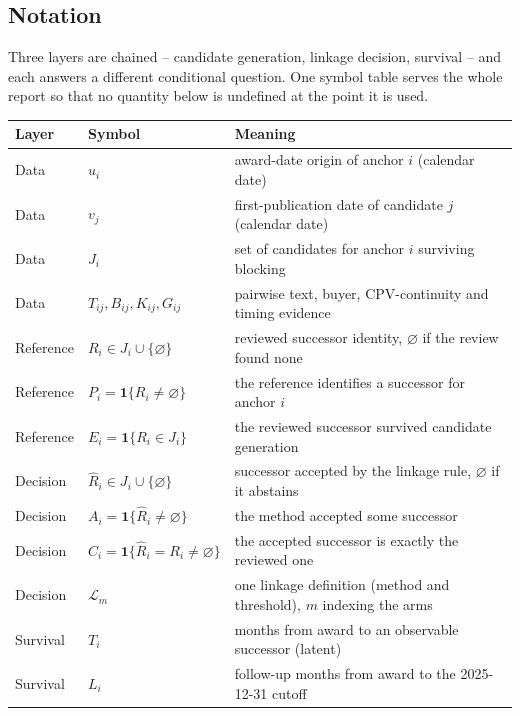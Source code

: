 \documentclass[11pt,a4paper]{article}
\begin{document}
\subsection{Notation}
\label{sec:notation}
Three layers are chained -- candidate generation, linkage decision, survival --
and each answers a different conditional question. One symbol table serves the
whole report so that no quantity below is undefined at the point it is used.

\begin{table}[H]
\centering
\small
\begin{tabularx}{\textwidth}{llX}
\toprule
Layer & Symbol & Meaning \\
\midrule
Data      & \(u_i\)                & award-date origin of anchor \(i\) (calendar date) \\
Data      & \(v_j\)                & first-publication date of candidate \(j\) (calendar date) \\
Data      & \(J_i\)                & set of candidates for anchor \(i\) surviving blocking \\
Data      & \(T_{ij}, B_{ij}, K_{ij}, G_{ij}\) & pairwise text, buyer, CPV-continuity and timing evidence \\
\midrule
Reference & \(R_i \in J_i\cup\{\varnothing\}\) & reviewed successor identity, \(\varnothing\) if the review found none \\
Reference & \(P_i=\mathbf{1}\{R_i\neq\varnothing\}\) & the reference identifies a successor for anchor \(i\) \\
Reference & \(E_i=\mathbf{1}\{R_i\in J_i\}\) & the reviewed successor survived candidate generation \\
\midrule
Decision  & \(\hat{R}_i \in J_i\cup\{\varnothing\}\) & successor accepted by the linkage rule, \(\varnothing\) if it abstains \\
Decision  & \(A_i=\mathbf{1}\{\hat{R}_i\neq\varnothing\}\) & the method accepted some successor \\
Decision  & \(C_i=\mathbf{1}\{\hat{R}_i=R_i\neq\varnothing\}\) & the accepted successor is exactly the reviewed one \\
Decision  & \(\mathcal{L}_m\)      & one linkage definition (method and threshold), \(m\) indexing the arms \\
\midrule
Survival  & \(T_i\)                & months from award to an observable successor (latent) \\
Survival  & \(L_i\)                & follow-up months from award to the 2025-12-31 cutoff \\

\end{tabularx}
\end{table}
\end{document}

